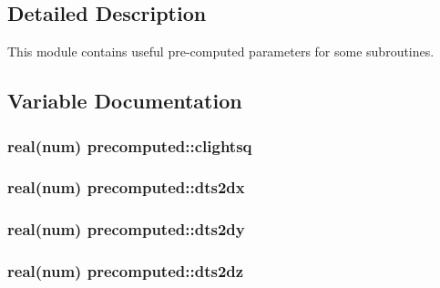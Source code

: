 \subsection{Detailed Description}
This module contains useful pre-\/computed parameters for some subroutines. 

\subsection{Variable Documentation}
\subsubsection[{\texorpdfstring{clightsq}{clightsq}}]{\setlength{\rightskip}{0pt plus 5cm}real(num) precomputed\+::clightsq}\hypertarget{namespaceprecomputed_adbd674e54a2326703d464d475f0d1dc2}{}\label{namespaceprecomputed_adbd674e54a2326703d464d475f0d1dc2}
\subsubsection[{\texorpdfstring{dts2dx}{dts2dx}}]{\setlength{\rightskip}{0pt plus 5cm}real(num) precomputed\+::dts2dx}\hypertarget{namespaceprecomputed_a49f042055cd92a009da4a02b628430f7}{}\label{namespaceprecomputed_a49f042055cd92a009da4a02b628430f7}
\subsubsection[{\texorpdfstring{dts2dy}{dts2dy}}]{\setlength{\rightskip}{0pt plus 5cm}real(num) precomputed\+::dts2dy}\hypertarget{namespaceprecomputed_a173032b2394c4ed6da5fb1364fe17e6a}{}\label{namespaceprecomputed_a173032b2394c4ed6da5fb1364fe17e6a}
\subsubsection[{\texorpdfstring{dts2dz}{dts2dz}}]{\setlength{\rightskip}{0pt plus 5cm}real(num) precomputed\+::dts2dz}\hypertarget{namespaceprecomputed_af41461f1d38aa90f6b75318b3a6e8b70}{}\label{namespaceprecomputed_af41461f1d38aa90f6b75318b3a6e8b70}
